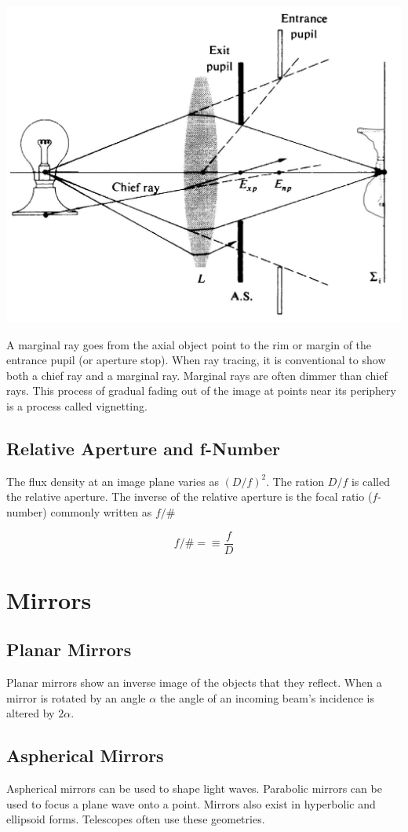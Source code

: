 \documentclass[12pt]{report}
\begin{document}
\includegraphics[scale=.25]{ChiefRay.jpg}

A marginal ray goes from the axial object point to the rim or margin of the entrance pupil (or aperture stop). When ray tracing, it is conventional to show both a chief ray and a marginal ray. Marginal rays are often dimmer than chief rays. This process of gradual fading out of the image at points near its periphery is a process called vignetting. 

\subsection{Relative Aperture and f-Number}
The flux density at an image plane varies as $(D/f)^2$. The ration $D/f$ is called the relative aperture. The inverse of the relative aperture is the focal ratio ($f$-number) commonly written as $f/\#$

\[f/\# = \equiv \frac{f}{D}\]

\section{Mirrors}
\subsection{Planar Mirrors}
Planar mirrors show an inverse image of the objects that they reflect. When a mirror is rotated by an angle $\alpha$ the angle of an incoming beam's incidence is altered by $2\alpha$.

\subsection{Aspherical Mirrors}
Aspherical mirrors can be used to shape light waves. Parabolic mirrors can be used to focus a plane wave onto a point. Mirrors also exist in hyperbolic and ellipsoid forms. Telescopes often use these geometries. 
\end{document}
